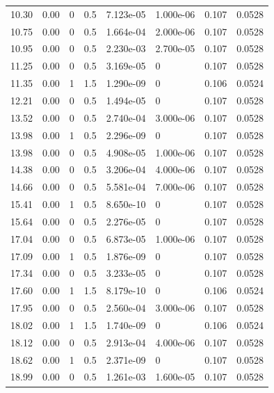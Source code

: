 \documentclass[preview]{standalone}
\begin{document}
{{\begin{tabular}{L{1.2cm}C{1.2cm} C{0.3cm}C{0.5cm} C{1.4cm}C{1.4cm} C{1.4cm}C{1.4cm}}
  10.30  &  0.00  & 0     & 0.5 &  7.123e-05  & 1.000e-06  & 0.107 &  0.0528   \\ 
  10.75  &  0.00  & 0     & 0.5 &  1.664e-04  & 2.000e-06  & 0.107 &  0.0528   \\ 
  10.95  &  0.00  & 0     & 0.5 &  2.230e-03  & 2.700e-05  & 0.107 &  0.0528   \\ 
  11.25  &  0.00  & 0     & 0.5 &  3.169e-05  & 0  & 0.107 &  0.0528   \\ 
  11.35  &  0.00  & 1     & 1.5 &  1.290e-09  & 0  & 0.106 &  0.0524   \\ 
  12.21  &  0.00  & 0     & 0.5 &  1.494e-05  & 0  & 0.107 &  0.0528   \\ 
  13.52  &  0.00  & 0     & 0.5 &  2.740e-04  & 3.000e-06  & 0.107 &  0.0528   \\ 
  13.98  &  0.00  & 1     & 0.5 &  2.296e-09  & 0  & 0.107 &  0.0528   \\ 
  13.98  &  0.00  & 0     & 0.5 &  4.908e-05  & 1.000e-06  & 0.107 &  0.0528   \\ 
  14.38  &  0.00  & 0     & 0.5 &  3.206e-04  & 4.000e-06  & 0.107 &  0.0528   \\ 
  14.66  &  0.00  & 0     & 0.5 &  5.581e-04  & 7.000e-06  & 0.107 &  0.0528   \\ 
  15.41  &  0.00  & 1     & 0.5 &  8.650e-10  & 0  & 0.107 &  0.0528   \\ 
  15.64  &  0.00  & 0     & 0.5 &  2.276e-05  & 0  & 0.107 &  0.0528   \\ 
  17.04  &  0.00  & 0     & 0.5 &  6.873e-05  & 1.000e-06  & 0.107 &  0.0528   \\ 
  17.09  &  0.00  & 1     & 0.5 &  1.876e-09  & 0  & 0.107 &  0.0528   \\ 
  17.34  &  0.00  & 0     & 0.5 &  3.233e-05  & 0  & 0.107 &  0.0528   \\ 
  17.60  &  0.00  & 1     & 1.5 &  8.179e-10  & 0  & 0.106 &  0.0524   \\ 
  17.95  &  0.00  & 0     & 0.5 &  2.560e-04  & 3.000e-06  & 0.107 &  0.0528   \\ 
  18.02  &  0.00  & 1     & 1.5 &  1.740e-09  & 0  & 0.106 &  0.0524   \\ 
  18.12  &  0.00  & 0     & 0.5 &  2.913e-04  & 4.000e-06  & 0.107 &  0.0528   \\ 
  18.62  &  0.00  & 1     & 0.5 &  2.371e-09  & 0  & 0.107 &  0.0528   \\ 
  18.99  &  0.00  & 0     & 0.5 &  1.261e-03  & 1.600e-05  & 0.107 &  0.0528   \\ 

\end{tabular}}}
\end{document}

